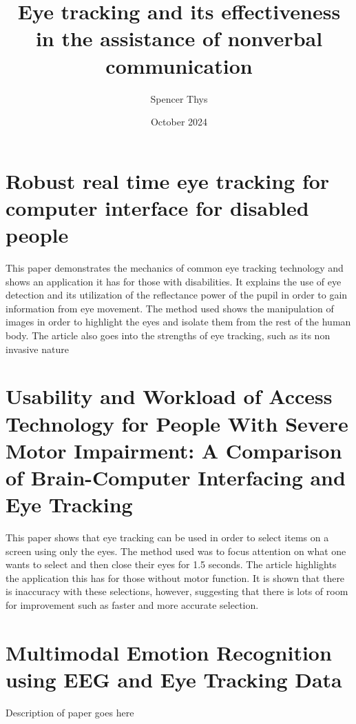 \documentclass[12pt]{article}
\title{Eye tracking and its effectiveness in the assistance of nonverbal communication}
\author{Spencer Thys}
\date{October 2024}
\begin{document}
\maketitle

\section{Robust real time eye tracking for computer interface for
disabled people}
This paper demonstrates the mechanics of common eye tracking technology and shows an application it has for those with disabilities.
It explains the use of eye detection and its utilization of the reflectance power of the pupil in order to gain information from eye movement.
The method used shows the manipulation of images in order to highlight the eyes and isolate them from the rest of the human body.
The article also goes into the strengths of eye tracking, such as its non invasive nature
 
\section{Usability and Workload of Access Technology for People With Severe Motor Impairment: A Comparison of Brain-Computer Interfacing and Eye Tracking}
This paper shows that eye tracking can be used in order to select items on a screen using only the eyes.
The method used was to focus attention on what one wants to select and then close their eyes for 1.5 seconds.
The article highlights the application this has for those without motor function.
It is shown that there is inaccuracy with these selections, however, suggesting that there is lots of room for improvement such as faster and more accurate selection.
\section{Multimodal Emotion Recognition using EEG and Eye Tracking Data}
Description of paper goes here
\end{document}

